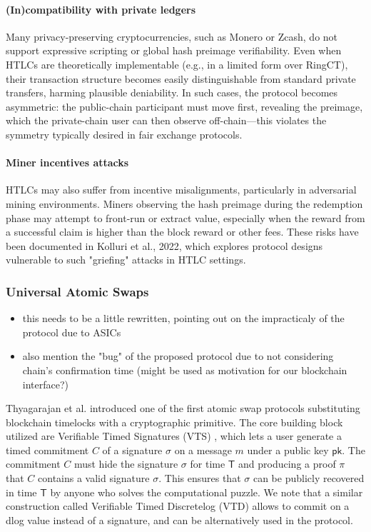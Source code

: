 \paragraph*{(In)compatibility with private ledgers}
Many privacy-preserving cryptocurrencies, such as Monero or Zcash, do not support expressive scripting or global hash preimage verifiability. Even when HTLCs are theoretically implementable (e.g., in a limited form over RingCT), their transaction structure becomes easily distinguishable from standard private transfers, harming plausible deniability. In such cases, the protocol becomes asymmetric: the public-chain participant must move first, revealing the preimage, which the private-chain user can then observe off-chain—this violates the symmetry typically desired in fair exchange protocols.
\paragraph*{Miner incentives attacks} HTLCs may also suffer from incentive misalignments, particularly in adversarial mining environments. Miners observing the hash preimage during the redemption phase may attempt to front-run or extract value, especially when the reward from a successful claim is higher than the block reward or other fees. These risks have been documented in Kolluri et al., 2022, which explores protocol designs vulnerable to such "griefing" attacks in HTLC settings.

\subsubsection{Universal Atomic Swaps}
\begin{itemize}
\item this needs to be a little rewritten, pointing out on the impracticaly of the protocol due to ASICs
\item also mention the "bug" of the proposed protocol due to not considering chain's confirmation time (might be used as motivation for our blockchain interface?)
\end{itemize}

Thyagarajan et al. \cite{uas} introduced one of the first atomic swap protocols substituting blockchain timelocks with a cryptographic primitive. 
The core building block utilized are Verifiable Timed Signatures (VTS) \cite{vts}, which lets a user generate a timed commitment $C$ of a signature $\sigma$ on a message $m$ under a public key $\mathsf{pk}$. The commitment $C $ must hide the signature $\sigma$ for time $\mathsf{T}$ and producing a proof $\pi$ that $C$ contains a valid signature $\sigma$. This ensures that $\sigma$ can be publicly recovered in time $\mathsf{T}$ by anyone who solves the computational puzzle. We note that a similar construction called Verifiable Timed Discretelog (VTD) allows to commit on a dlog value instead of a signature, and can be alternatively used in the protocol.

